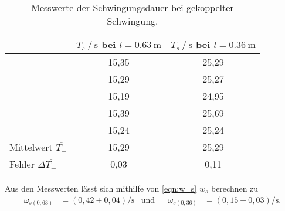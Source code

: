 \begin{table}[H]
  \centering
  \caption{Messwerte der Schwingungsdauer bei gekoppelter Schwingung.}
  \label{tab:Ts}
  \begin{tabular}{l S S}
    \toprule
     & {$T_s \mathbin{/} \si{\second}$ bei $l=\qty{0.63}{\meter}$} & {$T_s \mathbin{/} \si{\second}$ bei $l=\qty{0.36}{\meter}$}\\
    \midrule
      &15,35& 25,29\\
      &15,29& 25,27\\
      &15,19& 24,95\\
      &15,39& 25,69\\
      &15,24& 25,24\\
    \midrule
      Mittelwert $\overline{T_-}$& 15,29 & 25,29\\
      Fehler $\Delta \overline{T_-}$& 0,03 & 0,11\\
    \bottomrule
  \end{tabular}
\end{table}

Aus den Messwerten lässt sich mithilfe von \autoref{eqn:w_s} $w_s$ berechnen zu 
\begin{align*}
  \omega_{s(0,63)}&=(0,42 \pm 0,04) \si{\per\second} & \text{und} && \omega_{s(0,36)}&=(0,15 \pm 0,03) \si{\per\second}.
\end{align*}







